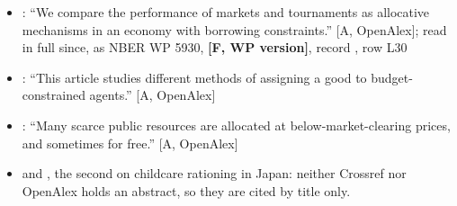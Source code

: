 \documentclass[11pt,a4paper]{article}
\newcommand{\aq}[2]{``#2''}
\begin{document}
\begin{itemize}
\item \citet{FernandezGali1999}: \aq{FernandezGali1999}{We compare the performance of markets and tournaments as allocative mechanisms in an economy with borrowing constraints.} [A, OpenAlex]; read in full since, as NBER WP 5930, \textbf{[F, WP version]}, record , row L30
\item \citet{CheGaleKim2013}: \aq{CheGaleKim2013}{This article studies different methods of assigning a good to budget-constrained agents.} [A, OpenAlex]
\item \citet{AkbarpourDworczakKominers2024}: \aq{AkbarpourDworczakKominers2024}{Many scarce public resources are allocated at below-market-clearing prices, and sometimes for free.} [A, OpenAlex]
\item \citet{Condorelli2013} and \citet{YamaguchiAsaiKambayashi2018}, the
  second on childcare rationing in Japan: neither Crossref nor OpenAlex holds
  an abstract, so they are cited by title only.
\end{itemize}
\end{document}
